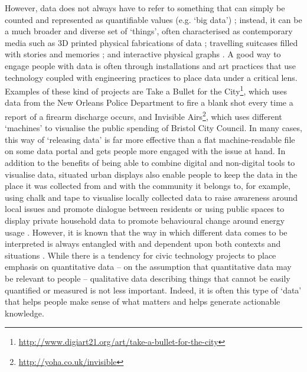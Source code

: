 However, data does not always have to refer to something that can simply be counted and represented as quantifiable values (e.g. `big data') \citep{michael_toward_2016,mcmillan_data_2016}; instead, it can be a much broader and diverse set of `things', often characterised as contemporary media such as 3D printed physical fabrications of data \citep{nissen_data-things:_2015}; travelling suitcases filled with stories and memories \citep{crivellaro_re-making_2016}; and interactive physical graphs \citep{sweeney_pixel_2019}. A good way to engage people with data is often through installations and art practices that use technology coupled with engineering practices to place data under a critical lens. Examples of these kind of projects are Take a Bullet for the City\footnote{\url{http://www.digiart21.org/art/take-a-bullet-for-the-city}}, which uses data from the New Orleans Police Department to fire a blank shot every time a report of a firearm discharge occurs, and Invisible Airs\footnote{\url{http://yoha.co.uk/invisible}}, which uses different `machines' to visualise the public spending of Bristol City Council. In many cases, this way of `releasing data' is far more effective than a flat machine-readable file on some data portal and gets people more engaged with the issue at hand. In addition to the benefits of being able to combine digital and non-digital tools to visualise data, situated urban displays also enable people to keep the data in the place it was collected from and with the community it belongs to, for example, using chalk and tape to visualise locally collected data to raise awareness around local issues and promote dialogue between residents \citep{koeman_what_2014} or using public spaces to display private household data to promote behavioural change around energy usage \citep{moere_comparative_2011,bird_pulse_2010}. However, it is known that the way in which different data comes to be interpreted is always entangled with and dependent upon both contexts and situations \citep{suchman_plans_1985,taylor_data--place:_2015}. While there is a tendency for civic technology projects to place emphasis on quantitative data -- on the assumption that quantitative data may be relevant to people -- qualitative data describing things that cannot be easily quantified or measured is not less important. Indeed, it is often this type of `data' that helps people make sense of what matters and helps generate actionable knowledge.

